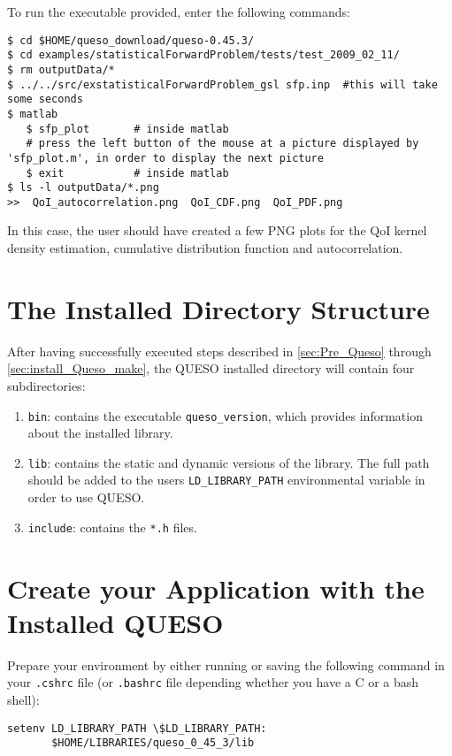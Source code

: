To run the executable provided, enter the following commands:
\begin{lstlisting}[label={},caption={}]
$ cd $HOME/queso_download/queso-0.45.3/
$ cd examples/statisticalForwardProblem/tests/test_2009_02_11/
$ rm outputData/*
$ ../../src/exstatisticalForwardProblem_gsl sfp.inp  #this will take some seconds
$ matlab
   $ sfp_plot       # inside matlab
   # press the left button of the mouse at a picture displayed by 'sfp_plot.m', in order to display the next picture
   $ exit           # inside matlab
$ ls -l outputData/*.png
>>  QoI_autocorrelation.png  QoI_CDF.png  QoI_PDF.png  
\end{lstlisting}


In this case, the user should have created a few PNG plots for the QoI kernel density estimation, cumulative distribution function and autocorrelation.


\section{The Installed Directory Structure} \label{sc-installed-dir-structure}

After having successfully executed steps described in \textsection{}\ref{sec:Pre_Queso} through \textsection{}\ref{sec:install_Queso_make}, the QUESO installed directory will contain four subdirectories:
\begin{enumerate}
 \item \verb+bin+: contains the executable \verb+queso_version+, which provides information about the installed library.
 \item \verb+lib+: contains the static and dynamic versions of the library. The full path should be added to the users \verb+LD_LIBRARY_PATH+ environmental variable in order to use QUESO.
 \item \verb+include+: contains the \verb+*.h+ files.
\end{enumerate}


\section{Create your Application with the Installed QUESO} \label{sc-use-queso}

Prepare your environment by either running or saving the following command in your \verb+.cshrc+ file (or \verb+.bashrc+ file depending whether you have a C or a bash shell):

\begin{lstlisting}[label={},caption={}]
setenv LD_LIBRARY_PATH \$LD_LIBRARY_PATH:
       $HOME/LIBRARIES/queso_0_45_3/lib
\end{lstlisting}


